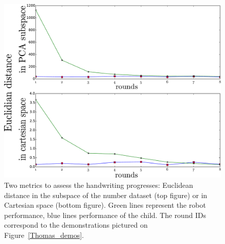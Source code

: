 \documentclass{sig-alternate}
\begin{document}
\begin{figure}
    \centering
    \includegraphics[width=0.9\linewidth]{learning_6_distances}
    \caption{\small Two metrics to assess the handwriting progresses: Euclidean
    distance in the subspace of the number dataset (top figure) or in
Cartesian space (bottom figure). Green lines represent the robot performance,
blue lines performance of the child. The round IDs correspond to the demonstrations
pictured on Figure~\ref{Thomas_demos}.}
    \label{Thomas_distances}
\end{figure}

\end{document}
